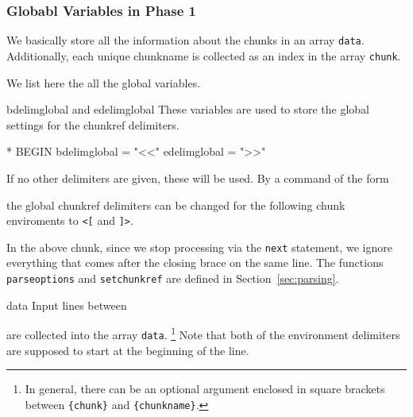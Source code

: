 \documentclass[a4paper]{article} %
\newenvironment{ttdescription}
  {\list{}{\labelwidth0pt \itemindent-\leftmargin
      \def\makelabel##1{\hspace\labelsep
        \normalfont\ttfamily ##1:}}}
  {\endlist}
\begin{document}
\subsubsection{Globabl Variables in Phase 1}

We basically store all the information about the chunks in an array
\texttt{data}. Additionally, each unique chunkname is collected as an
index in the array \texttt{chunk}.

We list here the all the global variables.
\begin{ttdescription}
\item[bdelimglobal \textrm{and} edelimglobal] These variables are used
  to store the global settings for the chunkref delimiters.
\begin{chunk}{*}
BEGIN {
  bdelimglobal = "<<"
  edelimglobal = ">>"
}
\end{chunk}
If no other delimiters are given, these will be used. 
By a command of the form
\begin{myverbatim}
\end{myverbatim}
the global chunkref delimiters can be changed for the following chunk
enviroments to \texttt{<[} and \texttt{]>}.
\begin{chunk}{*}
/^\\lstset{/ {
  lineidx = 8 # start parsing after "\lstset{"
  if (parseoptions() != "}") {error("Expected closing brace")}#$
  if (setchunkref()) {bdelimglobal = bdelim; edelimglobal = edelim}
  next
}
\end{chunk}
In the above chunk, since we stop processing via the \texttt{next}
statement, we ignore everything that comes after the closing brace on
the same line. The functions \texttt{parseoptions} and
\texttt{setchunkref} are defined in Section~\ref{sec:parsing}.

\item[data] Input lines between
\begin{myverbatim}
\end{myverbatim}
are collected into the array \texttt{data}.%
\footnote{In general, there can be an optional argument enclosed in
  square brackets between \texttt{\{chunk\}} and
  \texttt{\{chunkname\}}.}
%
Note that both of the environment delimiters are supposed to start at
the beginning of the line.


\end{ttdescription}
\end{document}

